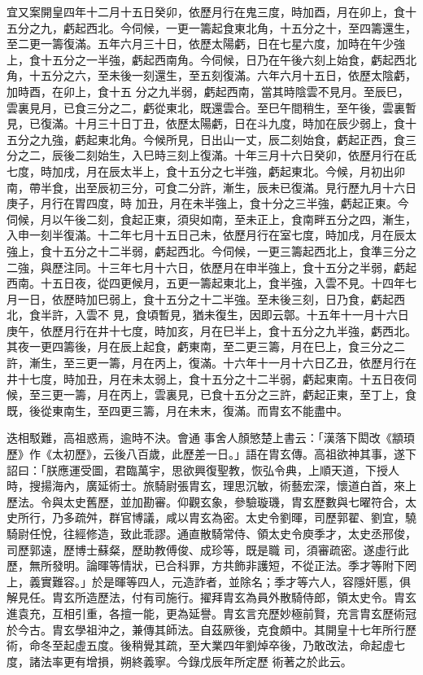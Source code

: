 \begin{pinyinscope}
 宜又案開皇四年十二月十五日癸卯，依歷月行在鬼三度，時加酉，月在卯上，食十五分之九，虧起西北。今伺候，一更一籌起食東北角，十五分之十，至四籌還生，至二更一籌復滿。五年六月三十日，依歷太陽虧，日在七星六度，加時在午少強上，食十五分之一半強，虧起西南角。今伺候，日乃在午後六刻上始食，虧起西北角，十五分之六，至未後一刻還生，至五刻復滿。六年六月十五日，依歷太陰虧，加時酉，在卯上，食十五
 分之九半弱，虧起西南，當其時陰雲不見月。至辰巳，雲裏見月，已食三分之二，虧從東北，既還雲合。至巳午間稍生，至午後，雲裏暫見，已復滿。十月三十日丁丑，依歷太陽虧，日在斗九度，時加在辰少弱上，食十五分之九強，虧起東北角。今候所見，日出山一丈，辰二刻始食，虧起正西，食三分之二，辰後二刻始生，入巳時三刻上復滿。十年三月十六日癸卯，依歷月行在氐七度，時加戌，月在辰太半上，食十五分之七半強，虧起東北。今候，月初出卯南，帶半食，出至辰初三分，可食二分許，漸生，辰未已復滿。見行歷九月十六日庚子，月行在胃四度，時
 加丑，月在未半強上，食十分之三半強，虧起正東。今伺候，月以午後二刻，食起正東，須臾如南，至未正上，食南畔五分之四，漸生，入申一刻半復滿。十二年七月十五日己未，依歷月行在室七度，時加戌，月在辰太強上，食十五分之十二半弱，虧起西北。今伺候，一更三籌起西北上，食準三分之二強，與歷注同。十三年七月十六日，依歷月在申半強上，食十五分之半弱，虧起西南。十五日夜，從四更候月，五更一籌起東北上，食半強，入雲不見。十四年七月一日，依歷時加巳弱上，食十五分之十二半強。至未後三刻，日乃食，虧起西北，食半許，入雲不
 見，食頃暫見，猶未復生，因即云鄣。十五年十一月十六日庚午，依歷月行在井十七度，時加亥，月在巳半上，食十五分之九半強，虧西北。其夜一更四籌後，月在辰上起食，虧東南，至二更三籌，月在巳上，食三分之二許，漸生，至三更一籌，月在丙上，復滿。十六年十一月十六日乙丑，依歷月行在井十七度，時加丑，月在未太弱上，食十五分之十二半弱，虧起東南。十五日夜伺候，至三更一籌，月在丙上，雲裏見，已食十五分之三許，虧起正東，至丁上，食既，後從東南生，至四更三籌，月在未末，復滿。而胄玄不能盡中。



 迭相駁難，高祖惑焉，逾時不決。會通
 事舍人顏慜楚上書云：「漢落下閎改《顓頊歷》作《太初歷》，云後八百歲，此歷差一日。」語在胄玄傳。高祖欲神其事，遂下詔曰：「朕應運受圖，君臨萬宇，思欲興復聖教，恢弘令典，上順天道，下授人時，搜揚海內，廣延術士。旅騎尉張胄玄，理思沉敏，術藝宏深，懷道白首，來上歷法。令與太史舊歷，並加勘審。仰觀玄象，參驗璇璣，胄玄歷數與七曜符合，太史所行，乃多疏舛，群官博議，咸以胄玄為密。太史令劉暉，司歷郭翟、劉宜，驍騎尉任悅，往經修造，致此乖謬。通直散騎常侍、領太史令庾季才，太史丞邢俊，司歷郭遠，歷博士蘇粲，歷助教傅俊、成珍等，既是職
 司，須審疏密。遂虛行此歷，無所發明。論暉等情狀，已合科罪，方共飾非護短，不從正法。季才等附下罔上，義實難容。」於是暉等四人，元造詐者，並除名；季才等六人，容隱奸慝，俱解見任。胄玄所造歷法，付有司施行。擢拜胄玄為員外散騎侍郎，領太史令。胄玄進袁充，互相引重，各擅一能，更為延譽。胄玄言充歷妙極前賢，充言胄玄歷術冠於今古。胄玄學祖沖之，兼傳其師法。自茲厥後，克食頗中。其開皇十七年所行歷術，命冬至起虛五度。後稍覺其疏，至大業四年劉焯卒後，乃敢改法，命起虛七度，諸法率更有增損，朔終義寧。今錄戊辰年所定歷
 術著之於此云。




\end{pinyinscope}
